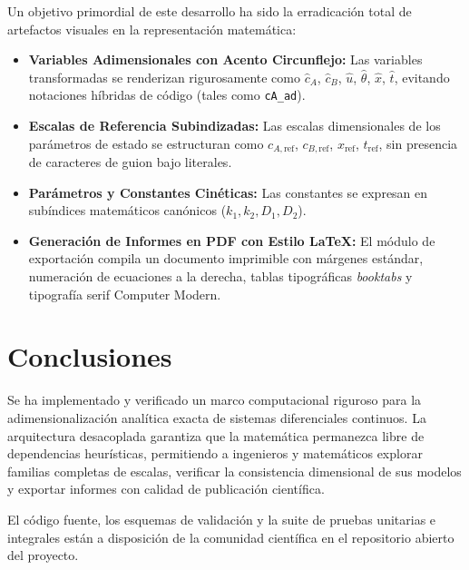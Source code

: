 \documentclass[11pt,a4paper]{article}
\theoremstyle{definition}
\theoremstyle{plain}
\theoremstyle{remark}
\begin{document}
Un objetivo primordial de este desarrollo ha sido la erradicación total de artefactos visuales en la representación matemática:
\begin{itemize}
    \item \textbf{Variables Adimensionales con Acento Circunflejo:} Las variables transformadas se renderizan rigurosamente como $\hat{c}_A$, $\hat{c}_B$, $\hat{u}$, $\hat{\theta}$, $\hat{x}$, $\hat{t}$, evitando notaciones híbridas de código (tales como \texttt{cA\_ad}).
    \item \textbf{Escalas de Referencia Subindizadas:} Las escalas dimensionales de los parámetros de estado se estructuran como $c_{A,\mathrm{ref}}$, $c_{B,\mathrm{ref}}$, $x_{\mathrm{ref}}$, $t_{\mathrm{ref}}$, sin presencia de caracteres de guion bajo literales.
    \item \textbf{Parámetros y Constantes Cinéticas:} Las constantes se expresan en subíndices matemáticos canónicos ($k_1, k_2, D_1, D_2$).
    \item \textbf{Generación de Informes en PDF con Estilo \LaTeX:} El módulo de exportación compila un documento imprimible con márgenes estándar, numeración de ecuaciones a la derecha, tablas tipográficas \textit{booktabs} y tipografía serif Computer Modern.
\end{itemize}

\section{Conclusiones}

Se ha implementado y verificado un marco computacional riguroso para la adimensionalización analítica exacta de sistemas diferenciales continuos. La arquitectura desacoplada garantiza que la matemática permanezca libre de dependencias heurísticas, permitiendo a ingenieros y matemáticos explorar familias completas de escalas, verificar la consistencia dimensional de sus modelos y exportar informes con calidad de publicación científica.

El código fuente, los esquemas de validación y la suite de pruebas unitarias e integrales están a disposición de la comunidad científica en el repositorio abierto del proyecto.
\end{document}
